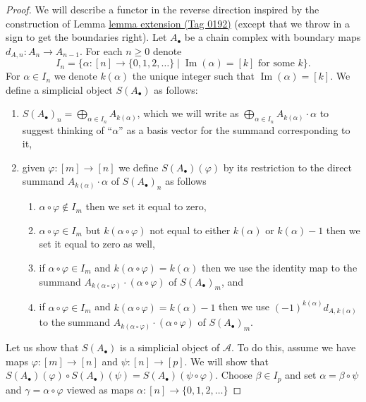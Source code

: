 \documentclass{amsart}
\theoremstyle{plain}
\theoremstyle{definition}
\theoremstyle{remark}
\numberwithin{equation}{subsection}
\def\Im{\mathop{\mathrm{Im}}}
\begin{document}
\begin{proof}
We will describe a functor in the reverse direction
inspired by the construction of Lemma \href{https://stacks.math.columbia.edu/tag/0192}{lemma extension (Tag 0192)}
(except that we throw in a sign to get the boundaries
right). Let $A_\bullet$ be a chain complex with boundary maps
$d_{A, n} : A_n \to A_{n - 1}$. For each $n \geq 0$ denote
$$
I_n =
\Big\{
\alpha : [n] \to \{0, 1, 2, \ldots\}
\mid
\Im(\alpha) = [k]\text{ for some }k
\Big\}.
$$
For $\alpha \in I_n$ we denote $k(\alpha)$ the unique
integer such that $\Im(\alpha) = [k]$.
We define a simplicial object $S(A_\bullet)$ as follows:
\begin{enumerate}
\item $S(A_\bullet)_n = \bigoplus_{\alpha \in I_n} A_{k(\alpha)}$, which
we will write as
$\bigoplus_{\alpha \in I_n} A_{k(\alpha)} \cdot \alpha$
to suggest thinking of ``$\alpha$'' as a basis vector for the
summand corresponding to it,
\item given $\varphi : [m] \to [n]$ we define
$S(A_\bullet)(\varphi)$ by its restriction to
the direct summand $A_{k(\alpha)} \cdot \alpha$
of $S(A_\bullet)_n$ as follows
\begin{enumerate}
\item $\alpha \circ \varphi \not \in I_m$ then we set it equal to zero,
\item $\alpha \circ \varphi \in I_m$ but $k(\alpha \circ \varphi)$
not equal to either $k(\alpha)$ or $k(\alpha) - 1$ then we set it
equal to zero as well,
\item if $\alpha \circ \varphi \in I_m$
and $k(\alpha \circ \varphi) = k(\alpha)$ then we use
the identity map to the summand
$A_{k(\alpha \circ \varphi)} \cdot (\alpha \circ \varphi)$
of $S(A_\bullet)_m$, and
\item if $\alpha \circ \varphi \in I_m$
and $k(\alpha \circ \varphi) = k(\alpha) - 1$
then we use $(-1)^{k(\alpha)} d_{A, k(\alpha)}$ to the summand
$A_{k(\alpha \circ \varphi)}\cdot (\alpha \circ \varphi)$
of $S(A_\bullet)_m$.
\end{enumerate}
\end{enumerate}
Let us show that $S(A_\bullet)$ is a simplicial object of $\mathcal{A}$.
To do this, assume we have maps $\varphi : [m] \to [n]$ and
$\psi : [n] \to [p]$. We will show that
$S(A_\bullet)(\varphi) \circ S(A_\bullet)(\psi) =
S(A_\bullet)(\psi \circ \varphi)$. Choose $\beta \in I_p$ and set
$\alpha = \beta \circ \psi$ and $\gamma = \alpha \circ \varphi$
viewed as maps $\alpha : [n] \to \{0, 1, 2, \ldots\}$

\end{proof}
\end{document}
